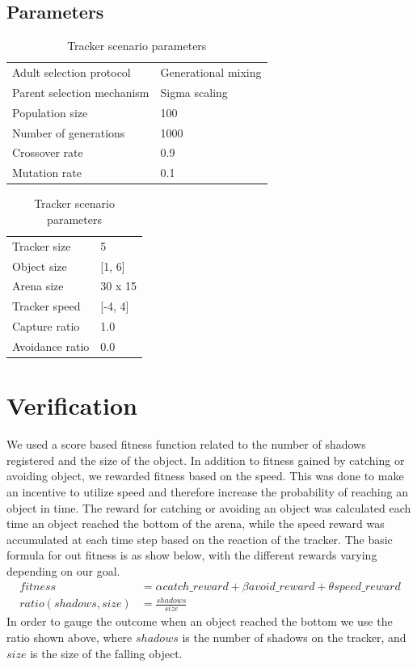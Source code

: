 \documentclass[10pt]{article}
\begin{document}
	\subsection{Parameters}
		\begin{table}[H]
			\parbox{.45\linewidth}{
				\centering
				\begin{tabular}{ll}
					Adult selection protocol & Generational mixing\\
					Parent selection mechanism & Sigma scaling\\
					Population size & 100\\
					Number of generations & 1000\\
					Crossover rate & 0.9\\
					Mutation rate & 0.1
				\end{tabular}
				\caption{Evolution algorithm parameters}
			}
			\hfill
			\parbox{.45\linewidth}{
				\centering
				\begin{tabular}{ll}
					Tracker size & 5\\
					Object size & [1, 6]\\
					Arena size & 30 x 15\\
					Tracker speed & [-4, 4]\\
					Capture ratio & 1.0\\
					Avoidance ratio & 0.0
				\end{tabular}
				\caption{Tracker scenario parameters}
			}
		\end{table}
\section{Verification}
	We used a score based fitness function related to the number of shadows registered and the size of the object. In addition to fitness gained by catching or avoiding object, we rewarded fitness based on the speed. This was done to make an incentive to utilize speed and therefore increase the probability of reaching an object in time. The reward for catching or avoiding an object was calculated each time an object reached the bottom of the arena, while the speed reward was accumulated at each time step based on the reaction of the tracker. The basic formula for out fitness is as show below, with the different rewards varying depending on our goal.
	\begin{align}
		fitness &= \alpha catch\_reward+\beta avoid\_reward+\theta speed\_reward\nonumber\\
		ratio(shadows, size) &= \frac{shadows}{size}\nonumber
	\end{align}
In order to gauge the outcome when an object reached the bottom we use the ratio shown above, where $shadows$ is the number of shadows on the tracker, and $size$ is the size of the falling object.
\end{document}
